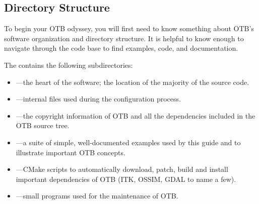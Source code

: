 \subsection{Directory Structure}
\label{sec:DirectoryStructure}

To begin your OTB odyssey, you will first need to know something about OTB's
software organization and directory structure. It is helpful to know enough to
navigate through the code base to find examples, code, and documentation.

The  contains the following subdirectories:
\begin{itemize}
        \item {}---the heart of the software; the location
        of the majority of the source code.
        \item {}---internal files used during the
        configuration process.
        \item {}---the copyright information of OTB
        and all the dependencies included in the OTB source tree.
        \item {}---a suite of simple, well-documented
        examples used by this guide and to illustrate important
        OTB concepts.
        \item {}---CMake scripts to automatically download, patch, build and install important
        dependencies of OTB (ITK, OSSIM, GDAL to name a few).
        \item {}---small programs used for the maintenance of OTB.
\end{itemize}


